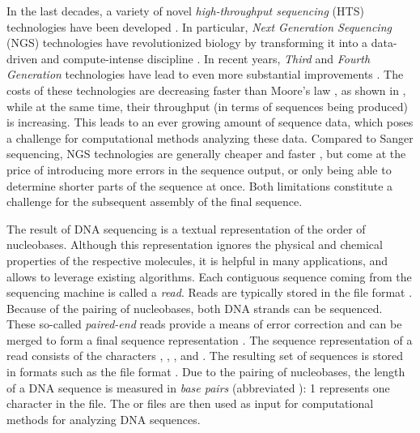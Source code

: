 In the last decades, a variety of novel \emph{high-throughput sequencing} (HTS) technologies
have been developed \cite{Pettersson2009,Reuter2015,Goodwin2016}.
In particular, \emph{Next Generation Sequencing} (NGS) technologies \cite{Logares2012,Mardis2013}
have revolutionized biology by transforming it into a data-driven and compute-intense discipline \citep{Escobar-Zepeda2015}.
In recent years, \emph{Third} and \emph{Fourth Generation} technologies
have lead to even more substantial improvements \cite{Pareek2011,Niedringhaus2011,Mignardi2014,Heather2016}.
The costs of these technologies are decreasing faster than Moore's law \cite{Moore1965,Wetterstrand2018},
as shown in ,
while at the same time, their throughput (in terms of sequences being produced) is increasing.
This leads to an ever growing amount of sequence data,
which poses a challenge for computational methods analyzing these data.
Compared to Sanger sequencing, NGS technologies are generally cheaper and faster \cite{Voelkerding2009,Metzker2010},
but come at the price of introducing more errors in the sequence output,
or only being able to determine shorter parts of the sequence at once.
Both limitations constitute a challenge for the subsequent assembly of the final sequence.

The result of \ac{DNA} sequencing is a textual representation of the order of nucleobases.
Although this representation ignores the physical and chemical properties of the respective molecules,
it is helpful in many applications, and allows to leverage existing algorithms.
Each contiguous sequence coming from the sequencing machine is called a \emph{read}.
Reads are typically stored in the  file format \citep{Cock2009}.
Because of the pairing of nucleobases, both \ac{DNA} strands can be sequenced.
These so-called \emph{paired-end} reads provide a means of error correction
and can be merged to form a final sequence representation \cite{Zhang2014}.
The sequence representation of a read consists of
the characters , , , and .
The resulting set of sequences is stored in formats such as the  file format \citep{Pearson1988}.
Due to the pairing of nucleobases,
the length of a \ac{DNA} sequence is measured in \emph{base pairs} (abbreviated \si{\basepair}):
\SI{1}{\basepair} represents one character in the file.
The  or  files are then used as input
for computational methods for analyzing \ac{DNA} sequences.

